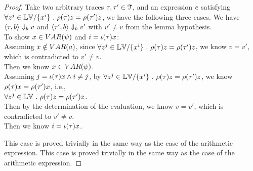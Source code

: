     \begin{proof}
		Take two arbitrary traces $\mathtt{\tau}, \mathtt{\tau}' \in \mathcal{T}$, and an expression $e$ satisfying
		$ \forall z^j \in \mathbb{LV} / \{x^i\} ~.~ 
		\rho(\mathtt{\tau}) z = \rho(\mathtt{\tau}') z $, we have the following three cases.
	We have $\langle \mathtt{\tau}, b \rangle \Downarrow_b v $ and 
	$\langle \mathtt{\tau}', b \rangle \Downarrow_b v' $ with $v' \neq v$ from the lemma hypothesis.
	\\
	To show $x \in VAR(\psi)$ and $i = \iota(\mathtt{\tau}) x$: 
	\\
	Assuming $x \notin VAR(a)$,
	since
	$ \forall z^j \in \mathbb{LV} / \{x^i\} ~.~ 
		\rho(\mathtt{\tau}) z = \rho(\mathtt{\tau}') z $,
	we know $v = v'$, which is contradicted to $v' \neq v$.
	\\
	Then we know $x \in VAR(\psi)$.
	\\
	Assuming $j = \iota(\mathtt{\tau}) x \land i \neq j$,
	by 
	$ \forall z^j \in \mathbb{LV} / \{x^i\} ~.~ 
		\rho(\mathtt{\tau}) z = \rho(\mathtt{\tau}') z $, we know 
		$\rho(\mathtt{\tau}) x = \rho(\mathtt{\tau}') x$, i.e., 
	\\
	$\forall z^j \in \mathbb{LV} ~.~ \rho(\mathtt{\tau}) z = \rho(\mathtt{\tau}') z$.
	\\
	Then by the determination of the evaluation, 
	we know $v = v'$, which is contradicted to $v' \neq v$.
	\\
	Then we know $i = \iota(\mathtt{\tau}) x$.

	This case is proved trivially in the same way as the case of the arithmetic expression.
	This case is proved trivially in the same way as the case of the arithmetic expression.
\end{proof}
